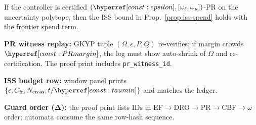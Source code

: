 \begin{proposition}\label{prop:pr-iss}
If the controller is certified $(\constref{epsilon},[\constsymomegal,\constsymomegau])$-PR on the uncertainty polytope, then the ISS bound in Prop.~\ref{prop:iss-spend} holds with the frontier spend term.
\end{proposition}

\begin{acceptchecks}
\item \textbf{PR witness replay:} GKYP tuple $(\Omega,\epsilon,P,Q)$ re-verifies; if margin crowds $\constref{PRmargin}$, the log must show auto-shrink of $\Omega$ and re-certification. The proof print includes \texttt{pr\_witness\_id}.
\item \textbf{ISS budget row:} window panel prints $\{\epsilon, C_{\mathrm{fr}}, N_{\mathrm{cross}}, t/\constref{taumin}\}$ and matches the ledger.
\item \textbf{Guard order (Δ):} the proof print lists IDs in EF$\rightarrow$DRO$\rightarrow$PR$\rightarrow$CBF$\rightarrow\omega$ order; automata consume the same row-hash sequence.
\end{acceptchecks}
